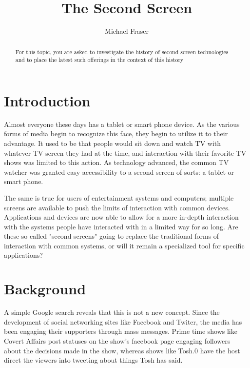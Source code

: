 \documentclass[11pt, oneside]{article}
\begin{document}
\title{The Second Screen}
\author{Michael Fraser}
\maketitle

\begin{abstract}
For this topic, 
you are asked to investigate the history of second 
screen technologies and to place the latest such 
offerings in the context of this history
\end{abstract}

\tableofcontents

\section{Introduction}
Almost everyone these days has a tablet or smart phone device. As the various forms of media begin to recognize this face, they begin to utilize it to their advantage. It used to be that people would sit down and watch TV with whatever TV screen they had at the time, and interaction with their favorite TV shows was limited to this action. As technology advanced, the common TV watcher was granted easy accessibility to a second screen of sorts: a tablet or smart phone. 

The same is true for users of entertainment systems and computers; multiple screens are available to push the limits of interaction with common devices. Applications and devices are now able to allow for a more in-depth interaction with the systems people have interacted with in a limited way for so long. Are these so called "second screens" going to replace the traditional forms of interaction with common systems, or will it remain a specialized tool for specific applications?


\section{Background}
A simple Google search reveals that this is not a new concept. Since the development of social networking sites like Facebook and Twiter, the media has been engaging their supporters through mass messages. Prime time shows like Covert Affairs post statuses on the show's facebook page engaging followers about the decisions made in the show, whereas shows like Tosh.0 have the host direct the viewers into tweeting about things Tosh has said. 
\end{document}
